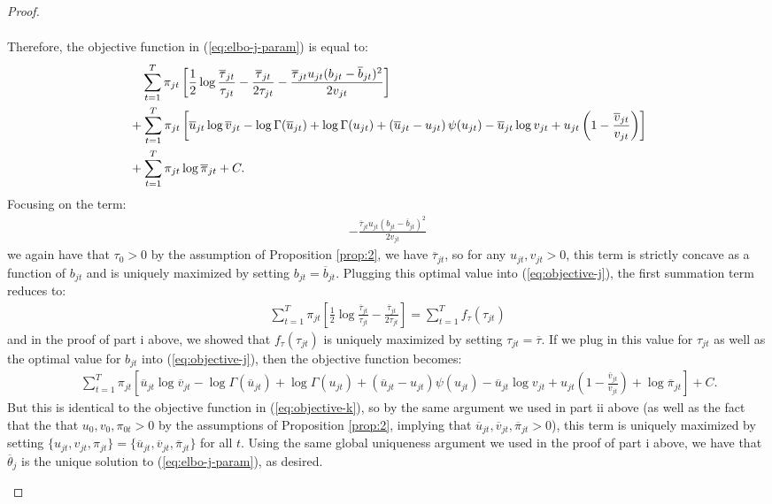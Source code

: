 \begin{proof}
\begin{enumerate}[label=\roman*.]
\begin{align*}
\end{align*}
\normalsize
Therefore, the objective function in (\ref{eq:elbo-j-param}) is equal to:
\small
\begin{align}
    &\quad\sum_{t=1}^T \pi_{jt}\left[\frac{1}{2}\log \frac{\overline{\tau}_{j t}}{\tau_{jt}} - \frac{\overline{\tau}_{j t}}{2\tau_{j t}}- \frac{\overline{\tau}_{j t}u_{jt}(b_{j t}  - \overline{b}_{j t})^2}{2v_{jt}}\right] \notag\\
    &+ \sum_{t=1}^T \pi_{jt}\left[\overline{u}_{jt} \log \overline{v}_{jt} -  \log\Gamma(\overline{u}_{jt}) + \log\Gamma(u_{jt}) + \left(\overline{u}_{jt} -u_{jt}\right)\psi(u_{jt}) - \overline{u}_{jt}\log v_{jt} + u_{jt}\left(1- \frac{\overline{v}_{jt} }{v_{jt}}\right)\right] \notag \\ \label{eq:objective-j}
    &+ \sum_{t=1}^T \pi_{jt} \log \overline{\pi}_{jt}+ C. 
\end{align}
\normalsize
Focusing on the term:
\begin{align*}
    - \frac{\overline{\tau}_{j t}u_{jt}(b_{j t}  - \overline{b}_{j t})^2}{2v_{jt}}
\end{align*}
we again have that $\tau_0 > 0$ by the assumption of Proposition \ref{prop:2}, we have $\overline{\tau}_{j t}$, so for any $u_{jt}, v_{jt} > 0$, this term is strictly concave as a function of $b_{j t}$ and is uniquely maximized by setting $b_{j t} = \overline{b}_{j t}$. Plugging this optimal value into (\ref{eq:objective-j}), the first summation term reduces to:
\begin{align*}
    \sum_{t=1}^T \pi_{jt}\left[\frac{1}{2}\log \frac{\overline{\tau}_{j t}}{\tau_{jt}}  - \frac{\overline{\tau}_{j t}}{2\tau_{j t}}\right] = \sum_{t=1}^T f_{\tau}(\tau_{jt})
\end{align*}
and in the proof of part i above, we showed that $f_{\tau}(\tau_{jt})$ is uniquely maximized by setting $\tau_{jt} = \overline{\tau}$. If we plug in this value for $\tau_{jt}$ as well as the optimal value for $b_{jt}$ into (\ref{eq:objective-j}), then the objective function becomes:
\small
\begin{align*}
    &\quad\sum_{t=1}^T \pi_{jt}\left[\overline{u}_{jt} \log \overline{v}_{jt} -  \log\Gamma(\overline{u}_{jt}) + \log\Gamma(u_{jt}) + \left(\overline{u}_{jt} -u_{jt}\right)\psi(u_{jt}) - \overline{u}_{jt}\log v_{jt} + u_{jt}\left(1- \frac{\overline{v}_{jt} }{v_{jt}}\right) + \log \overline{\pi}_{jt}\right] + C.
\end{align*}
\normalsize
But this is identical to the objective function in (\ref{eq:objective-k}), so by the same argument we used in part ii above (as well as the fact that the that $u_0,v_0,\pi_{0t} >0$ by the assumptions of Proposition \ref{prop:2}, implying that $\overline{u}_{jt}, \overline{v}_{jt}, \overline{\pi}_{jt} > 0$), this term is uniquely maximized by setting $\{u_{jt}, v_{jt}, \pi_{jt}\} = \{\overline{u}_{jt}, \overline{v}_{jt}, \overline{\pi}_{jt}\}$ for all $t$. Using the same global uniqueness argument we used in the proof of part i above, we have that $\overline{\theta}_j$ is the unique solution to (\ref{eq:elbo-j-param}), as desired.

\end{enumerate}
\end{proof}
